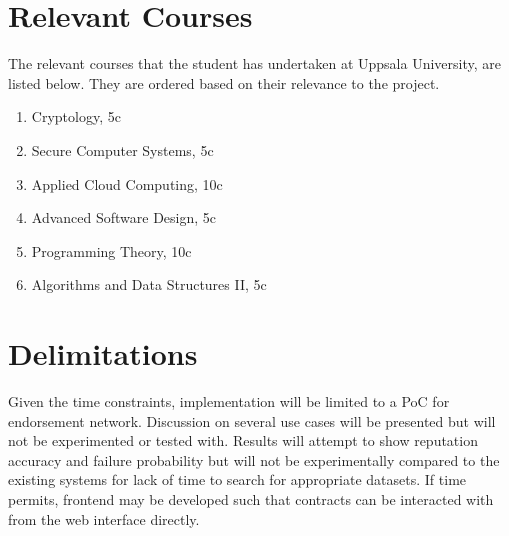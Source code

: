 \documentclass[a4paper,11pt,dvipsnames]{article}
\begin{document}
	\section*{Relevant Courses}
	The relevant courses that the student has undertaken at Uppsala University, 
	are listed below. They are ordered based on their relevance to the project.
	\begin{enumerate}
		\item Cryptology, 5c
		\item Secure Computer Systems, 5c
		\item Applied Cloud Computing, 10c
		\item Advanced Software Design, 5c
		\item Programming Theory, 10c
		\item Algorithms and Data Structures II, 5c
	\end{enumerate}

	\section*{Delimitations}
	Given the time constraints, implementation will be limited to a PoC for 
	endorsement network. Discussion on several use cases will be presented 
	but will not be experimented or tested with. Results will attempt to show 
	reputation accuracy and failure probability but will not be experimentally 
	compared to the existing systems for lack of time to search for appropriate 
	datasets. If time permits, frontend may be developed such that contracts can 
	be interacted with from the web interface directly.
	
\end{document}
